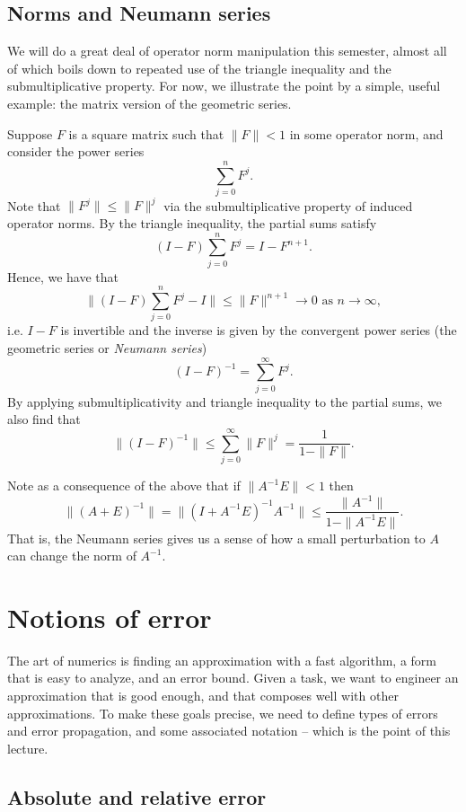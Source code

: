 \documentclass[12pt, leqno]{article} %
\begin{document}
\subsection{Norms and Neumann series}

We will do a great deal of operator norm manipulation this semester,
almost all of which boils down to repeated use of the triangle
inequality and the submultiplicative property.  For now, we illustrate
the point by a simple, useful example: the matrix version of
the geometric series.

Suppose $F$ is a square matrix such that $\|F\| < 1$ in
some operator norm, and consider the power series
\[
  \sum_{j=0}^n F^j.
\]
Note that $\|F^j\| \leq \|F\|^j$ via the submultiplicative property
of induced operator norms.
By the triangle inequality, the partial sums satisfy
\[
  (I-F) \sum_{j=0}^n F^j = I - F^{n+1}.
\]
Hence, we have that
\[
  \|(I-F) \sum_{j=0}^n F^j - I\| \leq \|F\|^{n+1} \rightarrow 0
  \mbox{ as } n \rightarrow \infty,
\]
i.e. $I-F$ is invertible and the inverse is given by the convergent
power series (the geometric series or {\em Neumann series})
\[
  (I-F)^{-1} = \sum_{j=0}^\infty F^j.
\]
By applying submultiplicativity and triangle inequality to the partial
sums, we also find that
\[
  \|(I-F)^{-1}\| \leq \sum_{j=0}^\infty \|F\|^j = \frac{1}{1-\|F\|}.
\]

Note as a consequence of the above that if $\|A^{-1} E\| < 1$ then
\[
  \|(A+E)^{-1}\|
  = \|(I+A^{-1} E)^{-1} A^{-1}\|
  \leq \frac{\|A^{-1}\|}{1-\|A^{-1} E\|}.
\]
That is, the Neumann series gives us a sense of how a small
perturbation to $A$ can change the norm of $A^{-1}$.

\section{Notions of error}

The art of numerics is finding an approximation with a fast algorithm,
a form that is easy to analyze, and an error bound.  Given a task, we
want to engineer an approximation that is good enough, and that
composes well with other approximations.  To make these goals precise,
we need to define types of errors and error propagation, and some
associated notation -- which is the point of this lecture.

\subsection{Absolute and relative error}
\end{document}
